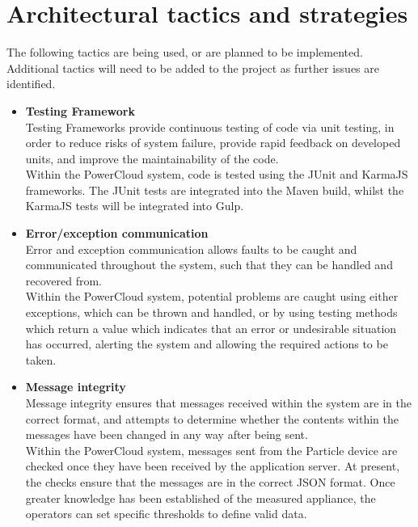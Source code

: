 \documentclass{article}
\begin{document}
\newpage

\section{Architectural tactics and strategies}

The following tactics are being used, or are planned to be implemented. Additional 
tactics will need to be added to the project as further issues are identified.

	\begin{itemize}
		\item \textbf{Testing Framework}\\
		Testing Frameworks provide continuous testing of code via unit testing, 
		in order to reduce risks of system failure, provide rapid feedback on 
		developed units, and improve the maintainability of the code.\\
		
		Within the PowerCloud system, code is tested using the JUnit and 
		KarmaJS frameworks. The JUnit tests are integrated into the Maven 
		build, whilst the KarmaJS tests will be integrated into Gulp.
		
		\item \textbf{Error/exception communication}\\
		Error and exception communication allows faults to be caught and 
		communicated throughout the system, such that they can be handled and 
		recovered from.\\
		
		Within the PowerCloud system, potential problems are caught using 
		either exceptions, which can be thrown and handled, or by using testing 
		methods which return a value which indicates that an error or 
		undesirable situation has occurred, alerting the system and allowing 
		the required actions to be taken.
		
		\item \textbf{Message integrity}\\
		Message integrity ensures that messages received within the system are 
		in the correct format, and attempts to determine whether the contents 
		within the messages have been changed in any way after being sent.\\
		
		Within the PowerCloud system, messages sent from the Particle device 
		are checked once they have been received by the application server. At 
		present, the checks ensure that the messages are in the correct JSON 
		format. Once greater knowledge has been established of the measured 
		appliance, the operators can set specific thresholds to define valid 
		data.
		

\end{itemize}
\end{document}
